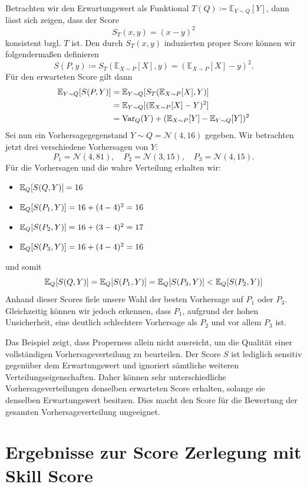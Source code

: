 \begin{bsp}
\label{bsp:propernogood}
Betrachten wir den Erwartungswert als Funktional $T(Q) \coloneqq \mathbb{E}_{Y \sim Q}[Y]$, dann lässt sich zeigen, dass der Score
\[
S_T(x,y) = (x - y)^2
\]
konsistent bzgl. $T$ ist. Den durch $S_T(x,y)$ induzierten proper Score können wir folgendermaßen definieren
\[
S(P,y) \coloneqq S_T(\mathbb{E}_{X \sim P}[X], y) = (\mathbb{E}_{X \sim P}[X] - y)^2.
\]
Für den erwarteten Score gilt dann
\begin{align*}
    \mathbb{E}_{Y \sim Q}[S(P,Y)]&=\mathbb{E}_{Y \sim Q}[S_T(\mathbb{E}_{X \sim P}[X], Y)]\\
    &= \mathbb{E}_{Y \sim Q}[(\mathbb{E}_{X \sim P}[X] - Y)^2]\\ 
    &= \mathrm{Var}_Q(Y) + (\mathbb{E}_{X \sim P}[Y]-\mathbb{E}_{Y \sim Q}[Y])^2
\end{align*}
Sei nun ein Vorhersagegegenstand $Y \sim Q=\mathcal{N}(4,16)$ gegeben. Wir betrachten jetzt drei verschiedene Vorhersagen von $Y$: \[P_1=\mathcal{N}(4,81),\quad P_2=\mathcal{N}(3,15),\quad P_3=\mathcal{N}(4,15).\]
Für die Vorhersagen und die wahre Verteilung erhalten wir:
\begin{itemize}
    \item $\mathbb{E}_{Q}[S(Q,Y)] =  16$
    \item $\mathbb{E}_{Q}[S(P_1,Y)]  = 16 + (4-4)^2 = 16$
    \item $\mathbb{E}_{Q}[S(P_2,Y)] = 16 + (3-4)^2 = 17$
    \item $\mathbb{E}_{Q}[S(P_3,Y)] = 16 + (4-4)^2 = 16$
\end{itemize}
und somit
\[ 
\mathbb{E}_{Q}[S(Q,Y)]=\mathbb{E}_{Q}[S(P_1,Y)]=\mathbb{E}_{Q}[S(P_3,Y)]<\mathbb{E}_{Q}[S(P_2,Y)]
\]
Anhand dieser Scores fiele unsere Wahl der besten Vorhersage auf $P_1$ oder $P_3$. Gleichzeitig können wir jedoch erkennen, dass $P_1$, aufgrund der hohen Unsicherheit, eine deutlich schlechtere Vorhersage als $P_2$ und vor allem $P_3$ ist. 

Das Beispiel zeigt, dass Properness allein nicht ausreicht, um die Qualität einer vollständigen Vorhersageverteilung zu beurteilen. Der Score $S$ ist lediglich sensitiv gegenüber dem Erwartungswert und ignoriert sämtliche weiteren Verteilungseigenschaften. Daher können sehr unterschiedliche Vorhersageverteilungen denselben erwarteten Score erhalten, solange sie denselben Erwartungswert besitzen. Dies macht den Score für die Bewertung der gesamten Vorhersageverteilung ungeeignet.
\end{bsp}



\section{Ergebnisse zur Score Zerlegung mit Skill Score} \label{seq:decomp-table}

